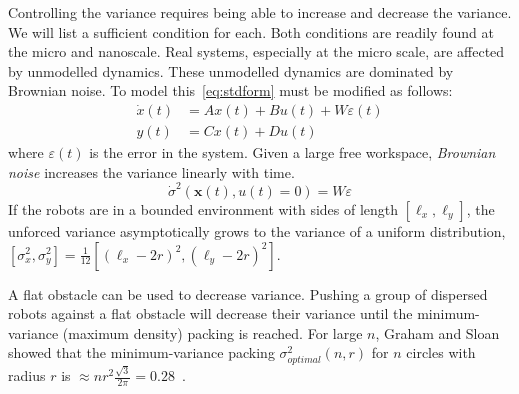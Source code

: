 Controlling the variance requires being able to increase and decrease the variance.  We will list a sufficient condition for each. Both conditions are readily found at the micro and nanoscale. 
Real systems, especially at the micro scale, are affected by unmodelled dynamics. These unmodelled dynamics are dominated by Brownian noise. To model this~\eqref{eq:stdform} must be modified as follows:
\begin{align}
\dot{x}(t)  &=  A x(t) + B u(t) + W \varepsilon(t)\\
y(t) &= C x(t) + D u(t)\nonumber
\end{align}
where $\varepsilon(t)$ is the error in the system. Given a large free workspace, \emph{Brownian noise} increases the variance linearly with time.
\begin{equation*}\dot{\sigma}^2(\mathbf{x}(t), u(t) = 0)  = W \varepsilon \end{equation*}
If the robots are in a bounded environment with sides of length $[\ell_x, \ell_y]$, the unforced variance asymptotically grows to the variance of a uniform distribution,
$[\sigma_x^2,\sigma_y^2] = \frac{1}{12}[ (\ell_x - 2 r)^2,(\ell_y - 2 r)^2]$.

 A flat obstacle can be used to decrease variance. Pushing a group of dispersed robots against a flat obstacle will decrease their variance until the minimum-variance (maximum density) packing  is reached. For large $n$, Graham and Sloan showed that the minimum-variance packing  $\sigma^2_{optimal}(n,r)$ for $n$ circles with radius $r$ is $\approx 
  n r^2 \frac{\sqrt{3}}{2 \pi} = 0.28$~\cite{graham1990penny}. 

